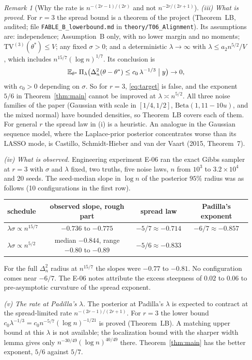 \documentclass[11pt]{article}
\theoremstyle{definition}
\theoremstyle{remark}
\newtheorem{remark}{Remark}
\newcommand{\E}{\mathbb{E}}
\newcommand{\TV}{\mathrm{TV}}
\newcommand{\thetas}{\theta^{*}}
\begin{document}
\begin{remark}[Why the rate is $n^{-(2r-1)/(2r)}$ and not $n^{-2r/(2r+1)}$]
\smallskip\noindent\emph{(iii) What is proved.} For $r=3$ the spread bound is a theorem of the project (Theorem~LB, audited; file \texttt{FABLE\_B\_lowerbound.md} in \texttt{theory/T06\_Alignment}). Its assumptions are: independence; Assumption~B only, with no lower margin and no moments; $\TV^{(3)}(\thetas)\le V$; any fixed $\sigma>0$; and a deterministic $\lambda\to\infty$ with $\lambda\le a_2n^{5/2}/V$, which includes $n^{15/7}(\log n)^{1/7}$. Its conclusion is
\[
\E_{\thetas}\,\Pi_\lambda\bigl(\Delta_n^2(\theta-\thetas)\le c_0\,\lambda^{-1/3}\bigm| y\bigr)\to 0 ,
\]
with $c_0>0$ depending on $\sigma$. So for $r=3$, \eqref{eq:target} is false, and the exponent $5/6$ in Theorem~\ref{thm:main} cannot be improved at $\lambda\asymp n^{5/2}$. All three noise families of the paper (Gaussian with scale in $[1/4,1/2]$, $\mathrm{Beta}(1,11-10u)$, and the mixed normal) have bounded densities, so Theorem~LB covers each of them. For general $r$ the spread law in (i) is a heuristic. An analogue in the Gaussian sequence model, where the Laplace-prior posterior concentrates worse than its LASSO mode, is Castillo, Schmidt-Hieber and van der Vaart (2015, Theorem~7).

\smallskip\noindent\emph{(iv) What is observed.} Engineering experiment E-06 ran the exact Gibbs sampler at $r=3$ with $\sigma$ and $\lambda$ fixed, two truths, five noise laws, $n$ from $10^3$ to $3.2\times10^4$ and 20 seeds. The seed-median slope in $\log n$ of the posterior $95\%$ radius was as follows (10 configurations in the first row).
\begin{center}\small
\begin{tabular}{lccc}
\toprule
schedule & observed slope, rough part & spread law & Padilla's exponent\\
\midrule
$\lambda\sigma\propto n^{15/7}$ & $-0.736$ to $-0.775$ & $-5/7\approx-0.714$ & $-6/7\approx-0.857$\\
$\lambda\sigma\propto n^{5/2}$ & median $-0.844$, range $-0.80$ to $-0.89$ & $-5/6\approx-0.833$ & \\
\bottomrule
\end{tabular}
\end{center}
For the full $\Delta_n^2$ radius at $n^{15/7}$ the slopes were $-0.77$ to $-0.81$. No configuration comes near $-6/7$. The E-06 notes attribute the excess steepness of $0.02$ to $0.06$ to pre-asymptotic curvature of the spread exponent.

\smallskip\noindent\emph{(v) The rate at Padilla's $\lambda$.} The posterior at Padilla's $\lambda$ is expected to contract at the spread-limited rate $n^{-(2r-1)/(2r+1)}$. For $r=3$ the lower bound $c_0\lambda^{-1/3}=c_0n^{-5/7}(\log n)^{-1/21}$ is proved (Theorem~LB). A matching upper bound at this $\lambda$ is not available; the localization bound with the sharper width lemma gives only $n^{-30/49}(\log n)^{40/49}$ there. Theorem~\ref{thm:main} has the better exponent, $5/6$ against $5/7$.
\end{remark}
\end{document}
